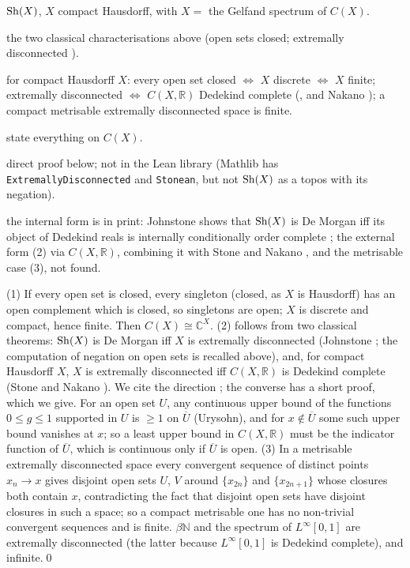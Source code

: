 \begin{trace}
\item[deck] $\mathrm{Sh}(X)$, $X$ compact Hausdorff, with $X = $ the Gelfand spectrum of $C(X)$.
\item[arch] the two classical characterisations above (open sets closed; extremally disconnected \cite{johnstone-demorgan}).
\item[specialise] for compact Hausdorff $X$: every open set closed $\iff$ $X$ discrete $\iff$ $X$ finite; extremally disconnected $\iff$ $C(X,\mathbb R)$ Dedekind complete (\cite[Thm~14]{stone-bounded}, and Nakano \cite{nakano}); a compact metrisable extremally disconnected space is finite.
\item[rewrite] state everything on $C(X)$.
\item[verify] direct proof below; not in the Lean library (Mathlib has \texttt{ExtremallyDisconnected} and \texttt{Stonean}, but not $\mathrm{Sh}(X)$ as a topos with its negation).
\item[novelty] the internal form is in print: Johnstone shows that $\mathrm{Sh}(X)$ is De Morgan iff its object of Dedekind reals is internally conditionally order complete \cite{johnstone-demorgan}; the external form (2) via $C(X,\mathbb R)$, combining it with Stone and Nakano \cite{stone-bounded,nakano}, and the metrisable case (3), not found.
\end{trace}

\direct{} (1) If every open set is closed, every singleton (closed, as $X$ is Hausdorff) has an open complement which is closed, so singletons are open; $X$ is discrete and compact, hence finite. Then $C(X)\cong\mathbb C^{X}$. (2) follows from two classical theorems: $\mathrm{Sh}(X)$ is De Morgan iff $X$ is extremally disconnected (Johnstone \cite{johnstone-demorgan}; the computation of negation on open sets is recalled above), and, for compact Hausdorff $X$, $X$ is extremally disconnected iff $C(X,\mathbb R)$ is Dedekind complete (Stone \cite[Thm~14]{stone-bounded} and Nakano \cite{nakano}). We cite the direction ; the converse has a short proof, which we give. For an open set $U$, any continuous upper bound of the functions $0\le g\le 1$ supported in $U$ is $\ge 1$ on $\overline U$ (Urysohn), and for $x\notin\overline U$ some such upper bound vanishes at $x$; so a least upper bound in $C(X,\mathbb R)$ must be the indicator function of $\overline U$, which is continuous only if $\overline U$ is open. (3) In a metrisable extremally disconnected space every convergent sequence of distinct points $x_n\to x$ gives disjoint open sets $U$, $V$ around $\{x_{2n}\}$ and $\{x_{2n+1}\}$ whose closures both contain $x$, contradicting the fact that disjoint open sets have disjoint closures in such a space; so a compact metrisable one has no non-trivial convergent sequences and is finite. $\beta\mathbb N$ and the spectrum of $L^\infty[0,1]$ are extremally disconnected (the latter because $L^\infty[0,1]$ is Dedekind complete), and infinite.\qed

